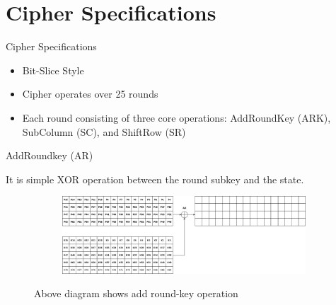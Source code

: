 \section{Cipher Specifications}

\begin{frame}{Cipher Specifications}
\begin{block}{}
    \begin{itemize}
    \item Bit-Slice Style
\item Cipher operates over 25 rounds
\item Each round consisting
of three core operations: AddRoundKey (ARK), SubColumn (SC), and ShiftRow (SR)
\end{itemize}
\end{block}

\end{frame}

\begin{frame}{AddRoundkey (AR)}
\begin{block}{}
It is simple XOR operation between the round subkey and the state.
    \begin{figure}[h!]
    \centering
    \begin{subfigure}[b]{1.0\textwidth}
        \centering
        \includegraphics[width=\textwidth]{SKCrypto.drawio.png} 
        \label{fig:image1}
    \end{subfigure}
    \caption{Above diagram shows add round-key operation}
    \label{fig:two_images}
\end{figure}
    
\end{block}
\end{frame}

